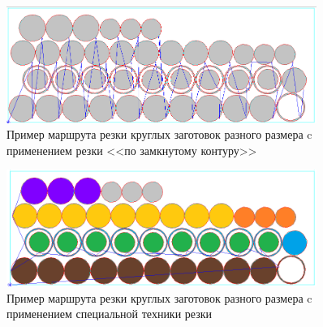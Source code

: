 \documentclass[11pt,twoside,openany]{report}
\begin{document}
\begin{figure}
  \begin{center}
  \includegraphics[width=0.9\textwidth]{circles-c.png}
  \caption{Пример маршрута резки круглых заготовок разного размера c применением резки <<по замкнутому контуру>>}
  \label{circles-c}
  \end{center}
\end{figure}

\begin{figure}
  \begin{center}
  \includegraphics[width=0.9\textwidth]{circles-d.png}
  \caption{Пример маршрута резки круглых заготовок разного размера c применением специальной техники резки}
  \label{circles-d}
  \end{center}
\end{figure}
\end{document}
